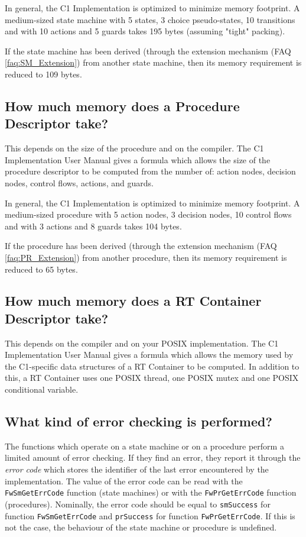 \documentclass[a4paper,10pt]{article}
\begin{document}
In general, the C1 Implementation is optimized to minimize memory footprint. A medium-sized state machine with 5 states, 3 choice pseudo-states, 
10 transitions and with 10 actions and 5 guards takes 195 bytes (assuming "tight" packing). 
 
If the state machine has been derived (through the extension mechanism (FAQ \ref{faq:SM_Extension}) from another state machine, then its memory requirement 
is reduced to 109 bytes.

\subsection{How much memory does a Procedure Descriptor take?}
This depends on the size of the procedure and on the compiler. The C1 Implementation User Manual gives a formula which allows the size of the procedure descriptor to be computed from the number of: action nodes, decision nodes, control flows, actions, and guards.

In general, the C1 Implementation is optimized to minimize memory footprint. A medium-sized procedure with 5 action nodes, 3 decision nodes, 
10 control flows and with 3 actions and 8 guards takes 104 bytes. 

If the procedure has been derived (through the extension mechanism (FAQ \ref{faq:PR_Extension}) from another procedure, then its memory requirement 
is reduced to 65 bytes.

\subsection{How much memory does a RT Container Descriptor take?}
This depends on the compiler and on your POSIX implementation. The C1 Implementation User Manual gives a formula which allows the memory used by the C1-specific data structures of a RT Container to be computed. In addition to this, a RT Container uses one POSIX thread, one POSIX mutex and one POSIX conditional variable.

\subsection{What kind of error checking is performed?}
The functions which operate on a state machine or on a procedure perform a limited amount of error checking. If they find an error, they report 
it through the \emph{error code} which stores the identifier of the last error encountered by the implementation. The value of the error code can be read 
with the \texttt{FwSmGetErrCode} function (state machines) or with the \texttt{FwPrGetErrCode} function (procedures). Nominally, the error code should 
be equal to \texttt{smSuccess} for function \texttt{FwSmGetErrCode} and \texttt{prSuccess} for function \texttt{FwPrGetErrCode}. If this is not the case, the behaviour of the state machine or procedure is undefined.
\end{document}
